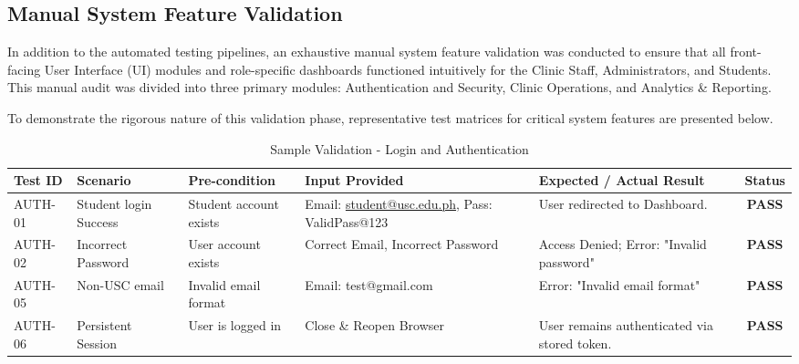 \subsection{Manual System Feature Validation}
In addition to the automated testing pipelines, an exhaustive manual system feature validation was conducted to ensure that all front-facing User Interface (UI) modules and role-specific dashboards functioned intuitively for the Clinic Staff, Administrators, and Students. This manual audit was divided into three primary modules: Authentication and Security, Clinic Operations, and Analytics \& Reporting.

To demonstrate the rigorous nature of this validation phase, representative test matrices for critical system features are presented below.

\begin{table}[htbp]
\centering
\caption{Sample Validation - Login and Authentication}
\label{tab:sample_auth}
\begin{tabularx}{\textwidth}{|l|Y|Y|Y|Y|c|}
\hline
\textbf{Test ID} & \textbf{Scenario} & \textbf{Pre-condition} & \textbf{Input Provided} & \textbf{Expected / Actual Result} & \textbf{Status} \\
\hline
AUTH-01 & Student login Success & Student account exists & Email: \url{student@usc.edu.ph}, Pass: ValidPass@123 & User redirected to Dashboard. & \textbf{PASS} \\
\hline
AUTH-02 & Incorrect Password & User account exists & Correct Email, Incorrect Password & Access Denied; Error: "Invalid password" & \textbf{PASS} \\
\hline
AUTH-05 & Non-USC email & Invalid email format & Email: test@gmail.com & Error: "Invalid email format" & \textbf{PASS} \\
\hline
AUTH-06 & Persistent Session & User is logged in & Close \& Reopen Browser & User remains authenticated via stored token. & \textbf{PASS} \\
\hline
\end{tabularx}
\end{table}

